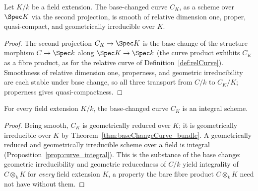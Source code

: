 \begin{theorem}
  \label{thm:baseChangeCurve_bundle}
  \leanok
  Let \(K/k\) be a field extension. The base-changed curve \(C_K\), as a scheme over \(\Spec K\)
  via the second projection, is smooth of relative dimension one, proper, quasi-compact, and
  geometrically irreducible over \(K\).
\end{theorem}
\begin{proof}
  \leanok
  The second projection \(C_K \to \Spec K\) is the base change of the structure morphism \(C \to
  \Spec k\) along \(\Spec K \to \Spec k\) (the curve product exhibits \(C_K\) as a fibre product,
  as for the relative curve of Definition~\ref{def:relCurve}). Smoothness of relative dimension
  one, properness, and geometric irreducibility are each stable under base change, so all three
  transport from \(C/k\) to \(C_K/K\); properness gives quasi-compactness.
\end{proof}

\begin{theorem}
  \label{thm:baseChangeCurve_integral}
  \leanok
  For every field extension \(K/k\), the base-changed curve \(C_K\) is an integral scheme.
\end{theorem}
\begin{proof}
  \leanok
  Being smooth, \(C_K\) is geometrically reduced over \(K\); it is geometrically irreducible over
  \(K\) by Theorem~\ref{thm:baseChangeCurve_bundle}. A geometrically reduced and geometrically
  irreducible scheme over a field is integral (Proposition~\ref{prop:curve_integral}). This is
  the substance of the base change: geometric irreducibility and geometric reducedness of \(C/k\)
  yield integrality of \(C \otimes_k K\) for \emph{every} field extension \(K\), a property the
  bare fibre product \(C \otimes_k K\) need not have without them.
\end{proof}

